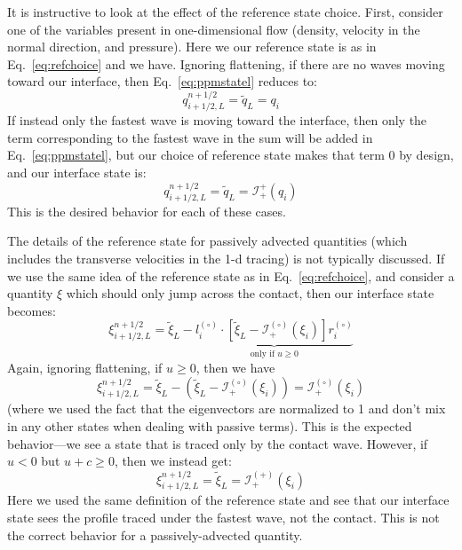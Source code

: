 \documentclass[12pt,preprint]{aastex}
\newcommand{\evz}{{(\circ)}}
\newcommand{\evp}{{(+)}}
\begin{document}
It is instructive to look at the effect of the reference state choice.
First, consider one of the variables present in one-dimensional flow
(density, velocity in the normal direction, and pressure).  Here we
our reference state is as in Eq.~\ref{eq:refchoice} and we have.
Ignoring flattening, if there are no waves moving toward our
interface, then Eq.~\ref{eq:ppmstatel} reduces to:
\begin{equation}
q_{i+1/2,L}^{n+1/2} = \tilde{q}_L = q_i
\end{equation}
If instead only the fastest wave is moving toward the interface, then
only the term corresponding to the fastest wave in the sum will be
added in Eq.~\ref{eq:ppmstatel}, but our choice of reference state makes
that term 0 by design, and our interface state is:
\begin{equation}
q_{i+1/2,L}^{n+1/2} = \tilde{q}_L = \mathcal{I}_+^{+}(q_i)
\end{equation}
This is the desired behavior for each of these cases. 

The details of the reference state for passively advected quantities 
(which includes the transverse velocities in the 1-d tracing) is not
typically discussed.  If we use the same idea of the reference state as
in Eq.~\ref{eq:refchoice}, and consider a quantity $\xi$ which should only
jump across the contact, then our interface state becomes:
\begin{equation}
\xi_{i+1/2,L}^{n+1/2} = \tilde{\xi}_L -
  \underbrace{l_i^\evz \cdot \left [
        \tilde{\xi}_L  - \mathcal{I}^\evz_+(\xi_i)
       \right ] r_i^\evz}_{\text{only if~$u \ge 0$}}
\end{equation}
Again, ignoring flattening, if $u \ge 0$, then we have
\begin{equation}
\xi_{i+1/2,L}^{n+1/2} = \tilde{\xi}_L -
  \left (\tilde{\xi}_L  - \mathcal{I}^\evz_+(\xi_i) \right ) = \mathcal{I}^\evz_+(\xi_i)
\end{equation}
(where we used the fact that the eigenvectors are normalized to 1 and
don't mix in any other states when dealing with passive terms).  This
is the expected behavior---we see a state that is traced only by the
contact wave.  However, if $u < 0$ but $u + c \ge 0$, then we instead get:
\begin{equation}
\xi_{i+1/2,L}^{n+1/2} = \tilde{\xi}_L = \mathcal{I}^\evp_+(\xi_i)
\end{equation}
Here we used the same definition of the reference state and see that our
interface state sees the profile traced under the fastest wave, not the
contact.  This is not the correct behavior for a passively-advected
quantity.  
\end{document}
